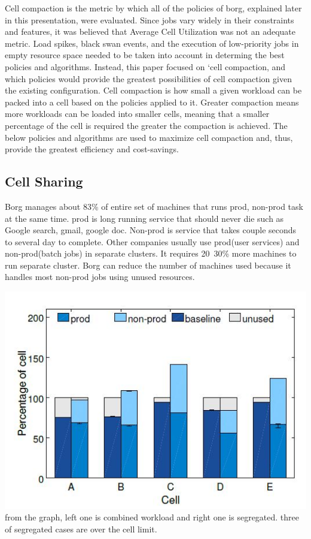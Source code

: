 \documentclass[runningheads,a4paper]{llncs}
\begin{document}
Cell compaction is the metric by which all of the policies of borg, explained later in this presentation, were evaluated.  Since jobs vary widely in their constraints and features, it was believed that Average Cell Utilization was not an adequate metric.  Load spikes, black swan events, and the execution of low-priority jobs in empty resource space needed to be taken into account in determing the best policies and algorithms.  Instead, this paper focused on ‘cell compaction, and which policies would provide the greatest possibilities of cell compaction given the existing configuration.  Cell compaction is how small a given workload can be packed into a cell based on the policies applied to it.  Greater compaction means more workloads can be loaded into smaller cells, meaning that a smaller percentage of the cell is required the greater the compaction is achieved.  The below policies and algorithms are used to maximize cell compaction and, thus, provide the greatest efficiency and cost-savings.


\subsection{Cell Sharing}

Borg manages about 83\% of entire set of machines that runs prod, non-prod task at the same time. prod is long running service that should never die such as Google search, gmail, google doc.
Non-prod is service that takes couple seconds to several day to complete. Other companies usually use prod(user services) and non-prod(batch jobs) in separate clusters. 
It requires 20~30\% more machines to run separate cluster.
Borg can reduce the number of machines used because it handles most non-prod jobs using unused resources.


\includegraphics[scale=0.8]{segregation}
from the graph, left one is combined workload and right one is segregated. three of segregated cases are over the cell limit.
\end{document}
